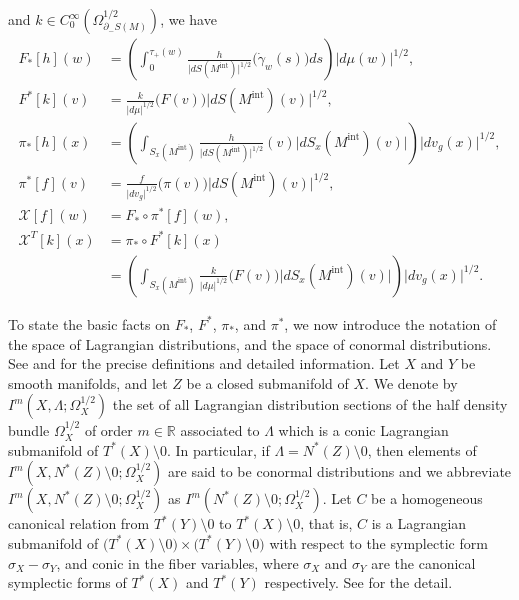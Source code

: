 \documentclass[a4paper,11pt,reqno]{amsart}
\numberwithin{equation}{section}
\theoremstyle{definition}
\theoremstyle{remark}
\begin{document}
and 
$k \in C^\infty_0(\Omega_{\partial_-S(M)}^{1/2})$, 
we have 
%
%
\begin{align*}
  F_\ast[h](w)
& =
  \left(
  \int_0^{\tau_+(w)}
  \frac{h}{\lvert{dS(M^\text{int})}\rvert^{1/2}}\bigl(\dot{\gamma}_w(s)\bigr)
  ds
  \right)
  \lvert{d\mu(w)}\rvert^{1/2}, 
\\
  F^\ast[k](v)
& =
  \frac{k}{\lvert{d\mu}\rvert^{1/2}}\bigl(F(v)\bigr)
  \lvert{dS(M^\text{int})(v)}\rvert^{1/2},
\\
  \pi_\ast[h](x)
& =
  \left(
  \int_{S_x(M^\text{int})}
  \frac{h}{\lvert{dS(M^\text{int})}\rvert^{1/2}}(v)
  \lvert{dS_x(M^\text{int})(v)}\rvert
  \right)
  \lvert{dv_g}(x)\rvert^{1/2},
\\
  \pi^\ast[f](v)
& =
  \frac{f}{\lvert{dv_g}\rvert^{1/2}}\bigl(\pi(v)\bigr)
  \lvert{dS(M^\text{int})(v)}\rvert^{1/2},
\\
  \mathcal{X}[f](w)
& =
  F_\ast{\circ}\pi^\ast[f](w),
\\
  \mathcal{X}^T[k](x)
& =
  \pi_\ast{\circ}F^\ast[k](x)
\\
& =
  \left(
  \int_{S_x(M^\text{int})}
  \frac{k}{\lvert{d\mu}\rvert^{1/2}}\bigl(F(v)\bigr)
  \lvert{dS_x(M^\text{int})(v)}\rvert
  \right)
  \lvert{dv_g}(x)\rvert^{1/2}.
\end{align*}
%
%
%
\par
%
%
To state the basic facts on $F_\ast$, $F^\ast$, $\pi_\ast$, and $\pi^\ast$, we now introduce the notation of the space of Lagrangian distributions, and the space of conormal distributions. See \cite[Sections~25.1 and 25.2]{Hoermander4} and \cite[Section~18.2]{Hoermander3} for the precise definitions and detailed information. 
Let $X$ and $Y$ be smooth manifolds, and let $Z$ be a closed submanifold of $X$. 
We denote by $I^m(X,\Lambda;\Omega_X^{1/2})$ the set of all Lagrangian distribution sections of the half density bundle $\Omega^{1/2}_X$ of order $m\in\mathbb{R}$ associated to $\Lambda$ which is a conic Lagrangian submanifold of $T^\ast(X)\setminus0$. In particular, if $\Lambda=N^\ast(Z)\setminus0$, then elements of $I^m(X,N^\ast(Z)\setminus0;\Omega_X^{1/2})$ are said to be conormal distributions and we abbreviate $I^m(X,N^\ast(Z)\setminus0;\Omega_X^{1/2})$ as $I^m(N^\ast(Z)\setminus0;\Omega_X^{1/2})$. 
Let $C$ be a homogeneous canonical relation from $T^\ast(Y)\setminus0$ to $T^\ast(X)\setminus0$, that is, $C$ is a Lagrangian submanifold of $\bigl(T^\ast(X)\setminus0\bigr) \times \bigl(T^\ast(Y)\setminus0\bigr)$ with respect to the symplectic form $\sigma_X-\sigma_Y$, and conic in the fiber variables, where $\sigma_X$ and $\sigma_Y$ are the canonical symplectic forms of $T^\ast(X)$ and $T^\ast(Y)$ respectively. See \cite[Chapter~21]{Hoermander3} for the detail. 
\end{document}
